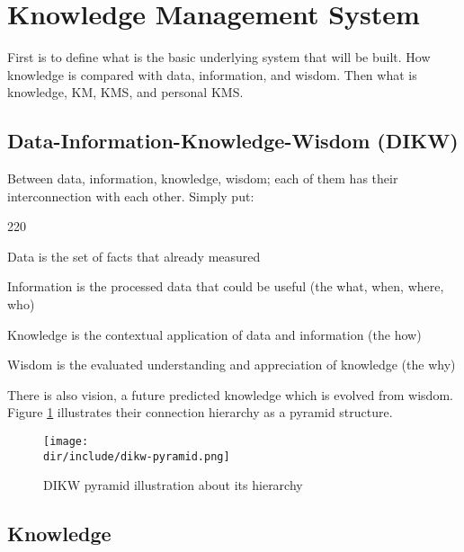 \section{Knowledge Management System}
\label{sec:kms}

First is to define what is the basic underlying system that will be built.
How knowledge is compared with data, information, and wisdom.
Then what is knowledge, \ac{KM}, \ac{KMS}, and personal \ac{KMS}.

\subsection{Data-Information-Knowledge-Wisdom (DIKW)}

Between data, information, knowledge, wisdom; each of them has their interconnection with each other. Simply put:

\begin{dinglist}{220}
\item Data is the set of facts that already measured
\item Information is the processed data that could be useful (the what, when, where, who)
\item Knowledge is the contextual application of data and information (the how)
\item Wisdom is the evaluated understanding and appreciation of knowledge (the why)
\end{dinglist}

There is also vision, a future predicted knowledge which is evolved from wisdom.
Figure \ref{fig:kms:dikw-pyramid} illustrates their connection hierarchy as a pyramid structure.

\begin{figure}[htbp]
    \centering
    \texttt{[image: \\dir/include/dikw-pyramid.png]}
    \caption[DIKW Pyramid]{DIKW pyramid illustration about its hierarchy}
    \label{fig:kms:dikw-pyramid}
\end{figure}

\subsection{Knowledge}

